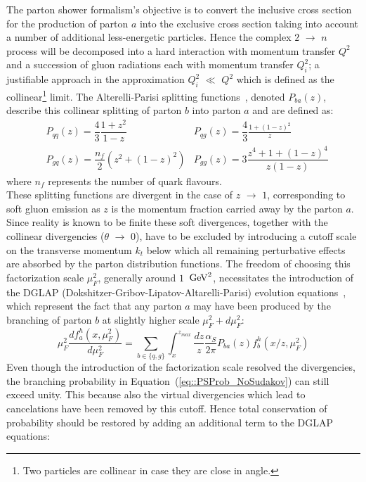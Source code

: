 The parton shower formalism's objective is to convert the inclusive cross section for the production of parton $a$ into the exclusive cross section taking into account a number of additional less-energetic particles.
Hence the complex $2$ $\rightarrow$ $n$ process will be decomposed into a hard interaction with momentum transfer $Q^{2}$ and a succession of gluon radiations each with momentum transfer $Q^{2}_{i}$; a justifiable approach in the approximation $Q_{i}^{2}$ $\ll$ $Q^2$ which is defined as the collinear\footnote{Two particles are collinear in case they are close in angle.} limit. 
The Alterelli-Parisi splitting functions~\cite{}, denoted $P_{ba}(z)$, describe this collinear splitting of parton $b$ into parton $a$ and are defined as:
\begin{eqnarray}
 & P_{qq}(z) = \dfrac{4}{3} \dfrac{1+z^{2}}{1-z}    & P_{qg}(z) = \dfrac{4}{3} \frac{1+(1-z)^{2}}{z} \\
 & P_{gq}(z) = \dfrac{n_{f}}{2} (z^{2} + (1-z)^{2}) & P_{gg}(z) = 3 \dfrac{z^{4}+1+(1-z)^{4}}{z(1-z)}
\end{eqnarray}
where $n_{f}$ represents the number of quark flavours.
\\
These splitting functions are divergent in the case of $z$ $\rightarrow$ $1$, corresponding to soft gluon emission as $z$ is the momentum fraction carried away by the parton $a$. 
Since reality is known to be finite these soft divergences, together with the collinear divergencies ($\theta$ $\rightarrow$ $0$), have to be excluded by introducing a cutoff scale on the transverse momentum $k_{t}$ below which all remaining perturbative effects are absorbed by the parton distribution functions. 
The freedom of choosing this factorization scale $\mu_{F}^{2}$, generally around $1$ $\, \mathrm{GeV}^{2}$, necessitates the introduction of the DGLAP (Dokshitzer-Gribov-Lipatov-Altarelli-Parisi) evolution equations~\cite{}, which represent the fact that any parton $a$ may have been produced by the branching of parton $b$ at slightly higher scale $\mu_{F}^2 + d\mu_{F}^2$:\\
\begin{equation}\label{eq::PSProb_NoSudakov}
 \mu_{F}^2 \dfrac{d f_{a}^{h}(x,\mu_{F}^{2})}{d \mu_{F}^{2}} = \sum_{b \in \{q,g\} } \int_{x}^{z_{max}} \dfrac{dz}{z} \dfrac{\alpha_{S}}{2 \pi} P_{ba}(z) f_{b}^{h}(x/z, \mu_{F}^{2})
\end{equation}
Even though the introduction of the factorization scale resolved the divergencies, the branching probability in Equation~(\ref{eq::PSProb_NoSudakov}) can still exceed unity. This because also the virtual divergencies which lead to cancelations have been removed by this cutoff. Hence total conservation of probability should be restored by adding an additional term to the DGLAP equations:
